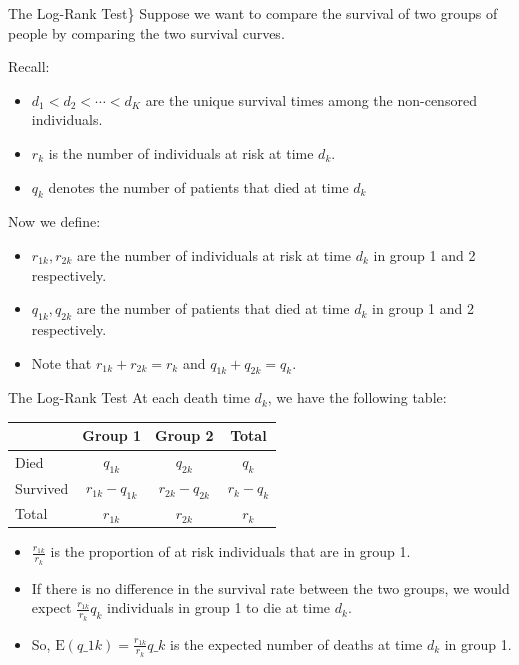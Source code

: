 \documentclass[
  ignorenonframetext,
  aspectratio=169,
]{beamer}
\begin{document}
\begin{frame}{The Log-Rank Test\}}
\protect\hypertarget{the-log-rank-test-1}{}
Suppose we want to \alert{compare the survival of two groups of people}
by comparing the two survival curves.

Recall:

\begin{itemize}
\item
  \(d_{1}<d_{2}<\cdots<d_{K}\) are the unique survival times among the
  non-censored individuals.
\item
  \(r_k\) is the number of individuals at risk at time \(d_k\).
\item
  \(q_k\) denotes the number of patients that died at time \(d_k\)
\end{itemize}

Now we define:

\begin{itemize}
\item
  \(r_{1k}, r_{2k}\) are the number of individuals at risk at time
  \(d_k\) in group 1 and 2 respectively.
\item
  \(q_{1k}, q_{2k}\) are the number of patients that died at time
  \(d_k\) in group 1 and 2 respectively.
\item
  Note that \(r_{1 k}+r_{2 k}=r_{k}\) and \(q_{1 k}+q_{2 k}=q_{k}\).
\end{itemize}
\end{frame}

\begin{frame}{The Log-Rank Test}
\protect\hypertarget{the-log-rank-test-2}{}
At each death time \(d_k\), we have the following table:

\begin{center}
\begin{tabular}{l|cc|c} 
& Group 1 & Group 2 & Total \\
\hline Died & $q_{1 k}$ & $q_{2 k}$ & $q_{k}$ \\
Survived & $r_{1 k}-q_{1 k}$ & $r_{2 k}-q_{2 k}$ & $r_{k}-q_{k}$ \\
\hline Total & $r_{1 k}$ & $r_{2 k}$ & $r_{k}$
\end{tabular}
\end{center}

\begin{itemize}
\item
  \(\frac{r_{1 k}}{r_{k}}\) is the proportion of at risk individuals
  that are in group 1.
\item
  If there is no difference in the survival rate between the two groups,
  we would expect \(\frac{r_{1 k}}{r_{k}}q_{k}\) individuals in group 1
  to die at time \(d_k\).
\item
  So, \(\mathrm{E}\left(q\_{1 k}\right)=\frac{r_{1 k}}{r_{k}} q\_{k}\)
  is the expected number of deaths at time \(d_k\) in group 1.
\end{itemize}
\end{frame}
\end{document}
